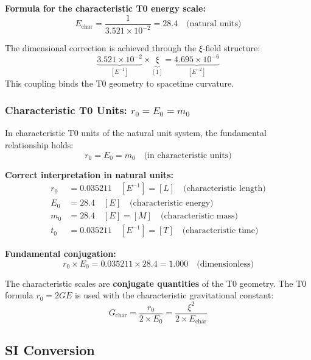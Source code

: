 \documentclass[12pt,a4paper]{report}
\begin{document}
	\textbf{Formula for the characteristic T0 energy scale:}
	\begin{equation}
		\boxed{E_{\text{char}} = \frac{1}{3.521 \times 10^{-2}} = 28.4 \quad \text{(natural units)}}
	\end{equation}
	
	The dimensional correction is achieved through the $\xi$-field structure:
	\begin{equation}
		\underbrace{3.521 \times 10^{-2}}_{[E^{-1}]} \times \underbrace{\xi}_{[1]} = \underbrace{4.695 \times 10^{-6}}_{[E^{-2}]}
	\end{equation}
	This coupling binds the T0 geometry to spacetime curvature.
	
	\subsubsection{Characteristic T0 Units: $r_0 = E_0 = m_0$}
	
	In characteristic T0 units of the natural unit system, the fundamental relationship holds:
	\begin{equation}
		r_0 = E_0 = m_0 \quad \text{(in characteristic units)}
	\end{equation}
	
	\textbf{Correct interpretation in natural units:}
	\begin{align}
		r_0 &= 0.035211 \quad [E^{-1}] = [L] \quad \text{(characteristic length)} \\
		E_0 &= 28.4 \quad [E] \quad \text{(characteristic energy)} \\
		m_0 &= 28.4 \quad [E] = [M] \quad \text{(characteristic mass)} \\
		t_0 &= 0.035211 \quad [E^{-1}] = [T] \quad \text{(characteristic time)}
	\end{align}
	
	\textbf{Fundamental conjugation:}
	\begin{equation}
		r_0 \times E_0 = 0.035211 \times 28.4 = 1.000 \quad \text{(dimensionless)}
	\end{equation}
	
	The characteristic scales are \textbf{conjugate quantities} of the T0 geometry. The T0 formula $r_0 = 2GE$ is used with the characteristic gravitational constant:
	\begin{equation}
		G_{\text{char}} = \frac{r_0}{2 \times E_0} = \frac{\xi^2}{2 \times E_{\text{char}}}
	\end{equation}
	
	\subsection{SI Conversion}
	
\end{document}
